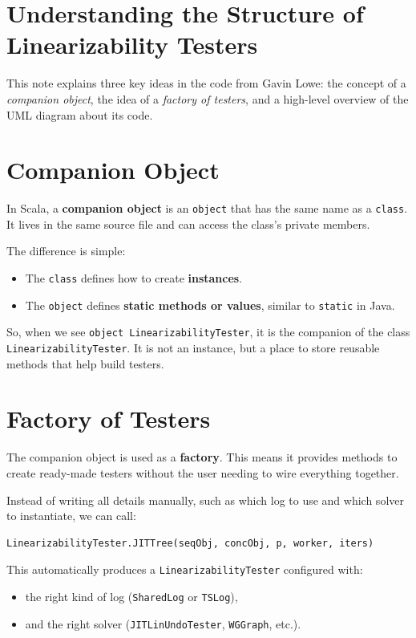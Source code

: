 \documentclass[12pt]{article}
\begin{document}
\section*{Understanding the Structure of Linearizability Testers}

This note explains three key ideas in the code from 
Gavin Lowe: the concept of a \textit{companion object},
 the idea of a \textit{factory of testers}, and a
  high-level overview of the UML diagram about its code.

\section{Companion Object}
In Scala, a \textbf{companion object} is 
an \texttt{object} that has the same name as a \texttt{class}. 
It lives in the same source file and 
can access the class’s private members. 

The difference is simple:
\begin{itemize}
  \item The \texttt{class} defines how to create \textbf{instances}.
  \item The \texttt{object} defines 
  \textbf{static methods or values}, similar to \texttt{static} in Java.
\end{itemize}

So, when we see \texttt{object LinearizabilityTester}, 
it is the companion of the class \texttt{LinearizabilityTester}. 
It is not an instance, but a place to store reusable methods that help build testers.

\section{Factory of Testers}
The companion object is used as a \textbf{factory}.
 This means it provides methods to create ready-made
  testers without the user needing to wire everything together. 

Instead of writing all details manually,
 such as which log to use and which solver
  to instantiate, we can call:
\begin{verbatim}
LinearizabilityTester.JITTree(seqObj, concObj, p, worker, iters)
\end{verbatim}

This automatically produces a \texttt{LinearizabilityTester} configured with:
\begin{itemize}
  \item the right kind of log (\texttt{SharedLog} or \texttt{TSLog}),
  \item and the right solver (\texttt{JITLinUndoTester}, \texttt{WGGraph}, etc.).
\end{itemize}
\end{document}
